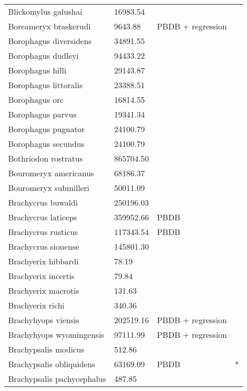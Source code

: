 \documentclass{article}
\begin{document}
\begin{center}
\begin{longtable}{p{} p{} p{} p{}}
    Blickomylus galushai & 16983.54 & \cite{Tomiya2013} &  \\ 
    Boreameryx braskerudi & 9643.88 & PBDB + regression &  \\ 
    Borophagus diversidens & 34891.55 & \cite{Tomiya2013} &  \\ 
    Borophagus dudleyi & 94433.22 & \cite{Dalquest1978} &  \\ 
    Borophagus hilli & 29143.87 & \cite{Tomiya2013} &  \\ 
    Borophagus littoralis & 23388.51 & \cite{Tomiya2013} &  \\ 
    Borophagus orc & 16814.55 & \cite{Tomiya2013} &  \\ 
    Borophagus parvus & 19341.34 & \cite{Tomiya2013} &  \\ 
    Borophagus pugnator & 24100.79 & \cite{Tomiya2013} &  \\ 
    Borophagus secundus & 24100.79 & \cite{Tomiya2013} &  \\ 
    Bothriodon rostratus & 865704.50 & \cite{Cassiliano2008} &  \\ 
    Bouromeryx americanus & 68186.37 & \cite{Tomiya2013} &  \\ 
    Bouromeryx submilleri & 50011.09 & \cite{Tomiya2013} &  \\ 
    Brachycrus buwaldi & 250196.03 & \cite{Tomiya2013} &  \\ 
    Brachycrus laticeps & 359952.66 & PBDB &  \\ 
    Brachycrus rusticus & 117343.54 & PBDB &  \\ 
    Brachycrus siouense & 145801.30 & \cite{Tomiya2013} &  \\ 
    Brachyerix hibbardi & 78.19 & \cite{Clemens2011} &  \\ 
    Brachyerix incertis & 79.84 & \cite{Tomiya2013} &  \\ 
    Brachyerix macrotis & 131.63 & \cite{Tomiya2013} &  \\ 
    Brachyerix richi & 340.36 & \cite{Tomiya2013} &  \\ 
    Brachyhyops viensis & 202519.16 & PBDB + regression &  \\ 
    Brachyhyops wyomingensis & 97111.99 & PBDB + regression &  \\ 
    Brachypsalis modicus & 512.86 & \cite{Tomiya2013} &  \\ 
    Brachypsalis obliquidens & 63169.09 & PBDB & * \\ 
    Brachypsalis pachycephalus & 487.85 & \cite{Tomiya2013} &  \\ 

\end{longtable}
\end{center}
\end{document}
